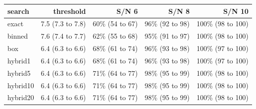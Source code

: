 \begin{tabular}{lrrrr}
\toprule
search & threshold & S/N 6 & S/N 8 & S/N 10 \\
\midrule
exact & 7.5 (7.3 to 7.8) & 60\% (54 to 67) & 96\% (92 to 98) & 100\% (98 to 100) \\
binned & 7.6 (7.4 to 7.7) & 62\% (55 to 68) & 95\% (91 to 97) & 100\% (98 to 100) \\
box & 6.4 (6.3 to 6.6) & 68\% (61 to 74) & 96\% (93 to 98) & 100\% (97 to 100) \\
hybrid1 & 6.4 (6.3 to 6.6) & 68\% (61 to 74) & 96\% (93 to 98) & 100\% (97 to 100) \\
hybrid5 & 6.4 (6.3 to 6.6) & 71\% (64 to 77) & 98\% (95 to 99) & 100\% (98 to 100) \\
hybrid10 & 6.4 (6.3 to 6.6) & 71\% (64 to 77) & 98\% (95 to 99) & 100\% (98 to 100) \\
hybrid20 & 6.4 (6.3 to 6.6) & 71\% (64 to 77) & 98\% (95 to 99) & 100\% (98 to 100) \\
\bottomrule
\end{tabular}
